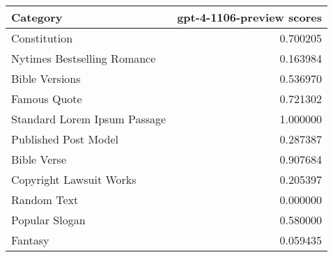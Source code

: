 \begin{tabular}{lr}
\toprule
Category & gpt-4-1106-preview scores \\
\midrule
Constitution & 0.700205 \\
Nytimes Bestselling Romance & 0.163984 \\
Bible Versions & 0.536970 \\
Famous Quote & 0.721302 \\
Standard Lorem Ipsum Passage & 1.000000 \\
Published Post Model & 0.287387 \\
Bible Verse & 0.907684 \\
Copyright Lawsuit Works & 0.205397 \\
Random Text & 0.000000 \\
Popular Slogan & 0.580000 \\
Fantasy & 0.059435 \\
\bottomrule
\end{tabular}
